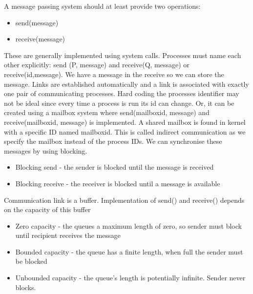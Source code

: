 \documentclass[a4paper]{article}
\theoremstyle{plain}
\theoremstyle{definition}
\newtheorem{defn}{Definition}[section]
\theoremstyle{remark}
\begin{document}
\begin{tcolorbox}[colback=black!3!white,colframe=black!60!white,title=\begin{defn}Message Passing Systems \label{Message Passing Systems}\end{defn}]
A message passing system should at least provide two operations:
\begin{itemize}
	\item send(message)
	\item receive(message)
\end{itemize}
These are generally implemented using system calls. Processes must name each other explicitly:
send (P, message)
and receive(Q, message) or receive(id,message). We have a message in the receive so we can store the message. Links are established automatically and a link is associated with exactly one pair of communicating processes. Hard coding the processes identifier may not be ideal since every time a process is run its id can change. Or, it can be created using a mailbox system where
send(mailboxid, message) and receive(mailboxid, message) is implemented. A shared mailbox is found in kernel with a specific ID named mailboxid. This is called indirect communication as we specify the mailbox instead of the process IDs. We can synchronise these messages by using blocking.
\begin{itemize}
	\item Blocking send - the sender is blocked until the message is received
	\item Blocking receive - the receiver is blocked until a message is available
\end{itemize}
\end{tcolorbox}
\begin{tcolorbox}[colback=black!3!white,colframe=black!60!white,title=\begin{defn}Buffering \label{Buffering}\end{defn}]
Communication link is a buffer. Implementation of send() and receive() depends on the capacity of this buffer
\begin{itemize}
	\item Zero capacity - the queues a maximum length of zero, so sender must block until recipient receives the message
	\item Bounded capacity - the queue has a finite length, when full the sender must be blocked
	\item Unbounded capacity - the queue's length is potentially infinite. Sender never blocks.
\end{itemize}
\end{tcolorbox}
\end{document}
